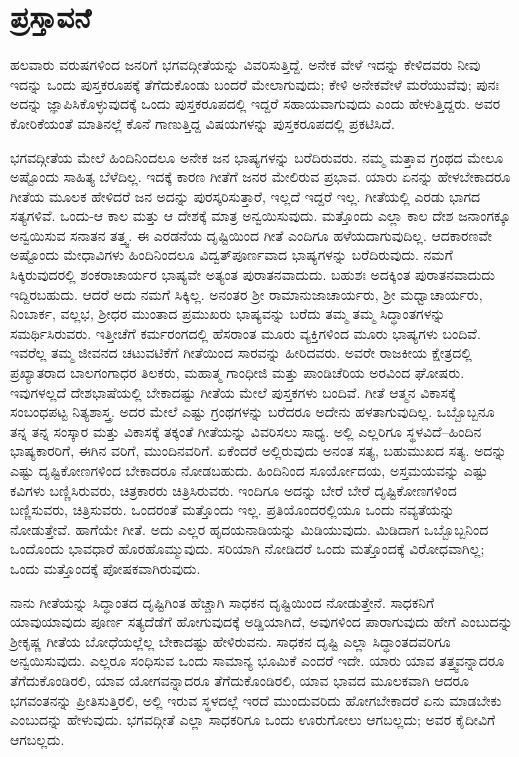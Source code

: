 
\chapter{ಪ್ರಸ್ತಾವನೆ}

ಹಲವಾರು ವರುಷಗಳಿಂದ ಜನರಿಗೆ ಭಗವದ್ಗೀತೆಯನ್ನು ವಿವರಿಸುತ್ತಿದ್ದೆ. ಅನೇಕ ವೇಳೆ ಇದನ್ನು ಕೇಳಿದವರು ನೀವು ಇದನ್ನು ಒಂದು ಪುಸ್ತಕರೂಪಕ್ಕೆ ತೆಗೆದುಕೊಂಡು ಬಂದರೆ ಮೇಲಾಗುವುದು; ಕೇಳಿ ಅನೇಕವೇಳೆ ಮರೆಯುವೆವು; ಪುನಃ ಅದನ್ನು ಜ್ಞಾಪಿಸಿಕೊಳ್ಳುವುದಕ್ಕೆ ಒಂದು ಪುಸ್ತಕರೂಪದಲ್ಲಿ ಇದ್ದರೆ ಸಹಾಯವಾಗುವುದು ಎಂದು ಹೇಳುತ್ತಿದ್ದರು. ಅವರ ಕೋರಿಕೆಯಂತೆ ಮಾತಿನಲ್ಲೆ ಕೊನೆ ಗಾಣುತ್ತಿದ್ದ ವಿಷಯಗಳನ್ನು ಪುಸ್ತಕರೂಪದಲ್ಲಿ ಪ್ರಕಟಿಸಿದೆ.

ಭಗವದ್ಗೀತೆಯ ಮೇಲೆ ಹಿಂದಿನಿಂದಲೂ ಅನೇಕ ಜನ ಭಾಷ್ಯಗಳನ್ನು ಬರೆದಿರುವರು. ನಮ್ಮ ಮತ್ತಾವ ಗ್ರಂಥದ ಮೇಲೂ ಅಷ್ಟೊಂದು ಸಾಹಿತ್ಯ ಬೆಳೆದಿಲ್ಲ. ಇದಕ್ಕೆ ಕಾರಣ ಗೀತೆಗೆ ಜನರ ಮೇಲಿರುವ ಪ್ರಭಾವ. ಯಾರು ಏನನ್ನು ಹೇಳಬೇಕಾದರೂ ಗೀತೆಯ ಮೂಲಕ ಹೇಳಿದರೆ ಜನ ಅದನ್ನು ಪುರಸ್ಕರಿಸುತ್ತಾರೆ, ಇಲ್ಲದೆ ಇದ್ದರೆ ಇಲ್ಲ. ಗೀತೆಯಲ್ಲಿ ಎರಡು ಭಾಗದ ಸತ್ಯಗಳಿವೆ. ಒಂದು-ಆ ಕಾಲ ಮತ್ತು ಆ ದೇಶಕ್ಕೆ ಮಾತ್ರ ಅನ್ವಯಿಸುವುದು. ಮತ್ತೊಂದು ಎಲ್ಲಾ ಕಾಲ ದೇಶ ಜನಾಂಗಕ್ಕೂ ಅನ್ವಯಿಸುವ ಸನಾತನ ತತ್ತ್ವ. ಈ ಎರಡನೆಯ ದೃಷ್ಟಿಯಿಂದ ಗೀತೆ ಎಂದಿಗೂ ಹಳೆಯದಾಗುವುದಿಲ್ಲ. ಆದಕಾರಣವೇ ಅಷ್ಟೊಂದು ಮೇಧಾವಿಗಳು ಹಿಂದಿನಿಂದಲೂ ವಿದ್ವತ್​ಪೂರ್ಣವಾದ ಭಾಷ್ಯಗಳನ್ನು ಬರೆದಿರುವುದು. ನಮಗೆ ಸಿಕ್ಕಿರುವುದರಲ್ಲಿ ಶಂಕರಾಚಾರ್ಯರ ಭಾಷ್ಯವೇ ಅತ್ಯಂತ ಪುರಾತನವಾದುದು. ಬಹುಶಃ ಅದಕ್ಕಿಂತ ಪುರಾತನವಾದುದು ಇದ್ದಿರಬಹುದು. ಆದರೆ ಅದು ನಮಗೆ ಸಿಕ್ಕಿಲ್ಲ. ಅನಂತರ ಶ‍್ರೀ ರಾಮಾನುಜಾಚಾರ್ಯರು, ಶ‍್ರೀ ಮಧ್ವಾಚಾರ್ಯರು, ನಿಂಬಾರ್ಕ, ವಲ್ಲಭ, ಶ‍್ರೀಧರ ಮುಂತಾದ ಪ್ರಮುಖರು ಭಾಷ್ಯವನ್ನು ಬರೆದು ತಮ್ಮ ತಮ್ಮ ಸಿದ್ಧಾಂತಗಳನ್ನು ಸಮರ್ಥಿಸಿರುವರು. ಇತ್ತೀಚೆಗೆ ಕರ್ಮರಂಗದಲ್ಲಿ ಹೆಸರಾಂತ ಮೂರು ವ್ಯಕ್ತಿಗಳಿಂದ ಮೂರು ಭಾಷ್ಯಗಳು ಬಂದಿವೆ. ಇವರೆಲ್ಲ ತಮ್ಮ ಜೀವನದ ಚಟುವಟಿಕೆಗೆ ಗೀತೆಯಿಂದ ಸಾರವನ್ನು ಹೀರಿದವರು. ಅವರೇ ರಾಜಕೀಯ ಕ್ಷೇತ್ರದಲ್ಲಿ ಪ್ರಖ್ಯಾತರಾದ ಬಾಲಗಂಗಾಧರ ತಿಲಕರು, ಮಹಾತ್ಮ ಗಾಂಧೀಜಿ ಮತ್ತು ಪಾಂಡಿಚೆರಿಯ ಅರವಿಂದ ಘೋಷರು. ಇವುಗಳಲ್ಲದೆ ದೇಶಭಾಷೆಯಲ್ಲಿ ಬೇಕಾದಷ್ಟು ಗೀತೆಯ ಮೇಲೆ ಪುಸ್ತಕಗಳು ಬಂದಿವೆ. ಗೀತೆ ಆತ್ಮನ ವಿಕಾಸಕ್ಕೆ ಸಂಬಂಧಪಟ್ಟ ನಿತ್ಯಶಾಸ್ತ್ರ. ಅದರ ಮೇಲೆ ಎಷ್ಟು ಗ್ರಂಥಗಳನ್ನು ಬರೆದರೂ ಅದೇನು ಹಳತಾಗುವುದಿಲ್ಲ. ಒಬ್ಬೊಬ್ಬನೂ ತನ್ನ ತನ್ನ ಸಂಸ್ಕಾರ ಮತ್ತು ವಿಕಾಸಕ್ಕೆ ತಕ್ಕಂತೆ ಗೀತೆಯನ್ನು ವಿವರಿಸಲು ಸಾಧ್ಯ. ಅಲ್ಲಿ ಎಲ್ಲರಿಗೂ ಸ್ಥಳವಿದೆ–ಹಿಂದಿನ ಭಾಷ್ಯಕಾರರಿಗೆ, ಈಗಿನ ವರಿಗೆ, ಮುಂದಿನವರಿಗೆ. ಏಕೆಂದರೆ ಅಲ್ಲಿರುವುದು ಅನಂತ ಸತ್ಯ, ಬಹುಮುಖದ ಸತ್ಯ. ಅದನ್ನು ಎಷ್ಟು ದೃಷ್ಟಿಕೋಣಗಳಿಂದ ಬೇಕಾದರೂ ನೋಡಬಹುದು. ಹಿಂದಿನಿಂದ ಸೂರ್ಯೋದಯ, ಅಸ್ತಮಯವನ್ನು ಎಷ್ಟು ಕವಿಗಳು ಬಣ್ಣಿಸಿರುವರು, ಚಿತ್ರಕಾರರು ಚಿತ್ರಿಸಿರುವರು. ಇಂದಿಗೂ ಅದನ್ನು ಬೇರೆ ಬೇರೆ ದೃಷ್ಟಿಕೋಣಗಳಿಂದ ಬಣ್ಣಿಸುವರು, ಚಿತ್ರಿಸುವರು. ಒಂದರಂತೆ ಮತ್ತೊಂದು ಇಲ್ಲ. ಪ್ರತಿಯೊಂದರಲ್ಲಿಯೂ ಒಂದು ನವ್ಯತೆಯನ್ನು ನೋಡುತ್ತೇವೆ. ಹಾಗೆಯೇ ಗೀತೆ. ಅದು ಎಲ್ಲರ ಹೃದಯನಾಡಿಯನ್ನು ಮಿಡಿಯುವುದು. ಮಿಡಿದಾಗ ಒಬ್ಬೊಬ್ಬನಿಂದ ಒಂದೊಂದು ಭಾವಧಾರೆ ಹೊರಹೊಮ್ಮುವುದು. ಸರಿಯಾಗಿ ನೋಡಿದರೆ ಒಂದು ಮತ್ತೊಂದಕ್ಕೆ ವಿರೋಧವಾಗಿಲ್ಲ; ಒಂದು ಮತ್ತೊಂದಕ್ಕೆ ಪೋಷಕವಾಗಿರುವುದು.

ನಾನು ಗೀತೆಯನ್ನು ಸಿದ್ಧಾಂತದ ದೃಷ್ಟಿಗಿಂತ ಹೆಚ್ಚಾಗಿ ಸಾಧಕನ ದೃಷ್ಟಿಯಿಂದ ನೋಡುತ್ತೇನೆ. ಸಾಧಕನಿಗೆ ಯಾವುಯಾವುದು ಪೂರ್ಣ ಸತ್ಯದೆಡೆಗೆ ಹೋಗುವುದಕ್ಕೆ ಅಡ್ಡಿಯಾಗಿದೆ, ಅವುಗಳಿಂದ ಪಾರಾಗುವುದು ಹೇಗೆ ಎಂಬುದನ್ನು ಶ‍್ರೀಕೃಷ್ಣ ಗೀತೆಯ ಬೋಧೆಯಲ್ಲೆಲ್ಲ ಬೇಕಾದಷ್ಟು ಹೇಳಿರುವನು. ಸಾಧಕನ ದೃಷ್ಟಿ ಎಲ್ಲಾ ಸಿದ್ಧಾಂತದವರಿಗೂ ಅನ್ವಯಿಸುವುದು. ಎಲ್ಲರೂ ಸಂಧಿಸುವ ಒಂದು ಸಾಮಾನ್ಯ ಭೂಮಿಕೆ ಎಂದರೆ ಇದೇ. ಯಾರು ಯಾವ ತತ್ತ್ವವನ್ನಾದರೂ ತೆಗೆದುಕೊಂಡಿರಲಿ, ಯಾವ ಯೋಗವನ್ನಾದರೂ ತೆಗೆದುಕೊಂಡಿರಲಿ, ಯಾವ ಭಾವದ ಮೂಲಕವಾಗಿ ಆದರೂ ಭಗವಂತನನ್ನು ಪ್ರೀತಿಸುತ್ತಿರಲಿ, ಅಲ್ಲಿ ಇರುವ ಸ್ಥಳದಲ್ಲೆ ಇರದೆ ಮುಂದುವರಿದು ಹೋಗಬೇಕಾದರೆ ಏನು ಮಾಡಬೇಕು ಎಂಬುದನ್ನು ಹೇಳುವುದು. ಭಗವದ್ಗೀತೆ ಎಲ್ಲಾ ಸಾಧಕರಿಗೂ ಒಂದು ಊರುಗೋಲು ಆಗಬಲ್ಲದು; ಅವರ ಕೈದೀವಿಗೆ ಆಗಬಲ್ಲದು.

